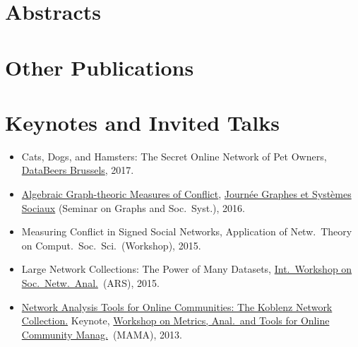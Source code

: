 \documentclass[line,mm]{res}
\newcounter{x}
\newcounter{y}
\newcommand{\talknumber}{T\arabic{y}\stepcounter{y}}
\newcounter{z}
\begin{document}
\begin{resume}
\section{Abstracts}          
\section{Other Publications} 

\section{Keynotes and Invited Talks}
\begin{itemize}
\item[{[\talknumber]}]
  Cats, Dogs, and Hamsters:  The Secret Online Network of Pet Owners,
  \href{http://databeers.brussels/}{DataBeers Brussels}, 2017.   
\item[{[\talknumber]}] 
  \href{https://www.slideshare.net/kunegis/algebraic-graphtheoretic-measures-of-conflict}{Algebraic Graph-theoric Measures of Conflict}, 
  \href{http://jgss.sciencesconf.org/}{Journée Graphes et Systèmes
    Sociaux} (Seminar on Graphs and Soc.\ Syst.), 2016.  
\item[{[\talknumber]}] Measuring Conflict in Signed Social Networks, 
  Application of Netw.\ Theory on Comput.\ Soc.\ Sci.\ (Workshop), 2015.
\item[{[\talknumber]}] 
  Large Network Collections:  The Power of Many Datasets,
  \href{http://www.ars15.unisa.it/}{Int.\ Workshop on Soc.\ Netw.\ Anal.}\ (ARS), 2015. 
\item[{[\talknumber]}] 
  \href{https://github.com/kunegis/pdfs/blob/master/kunegis:konect-mama.presentation.pdf}{Network
    Analysis Tools for Online Communities: The Koblenz Network 
    Collection.} Keynote, \href{http://mama.west.uni-koblenz.de/}{Workshop
    on Metrics, Anal.\ and Tools for Online Community Manag.}\ (MAMA), 2013.  
\end{itemize}


\end{resume}
\end{document}
